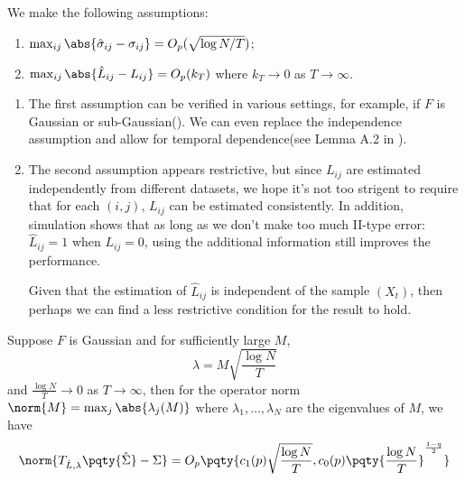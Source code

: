 \begin{asmp}\label{asmp:1}
    We make the following assumptions:
    \begin{enumerate}
        \item \(\max_{ij} \abs{\hat{\sigma}_{ij} - \sigma_{ij}} = O_{p}(\sqrt{\log N / T})\);
        \item \(\max_{ij} \abs{\hat{L}_{ij} - L_{ij}} = O_{p}(k_{T})\) where \(k_{T} \to 0\) as \(T \to \infty\).
    \end{enumerate}
\end{asmp}
\begin{remark}
    \begin{enumerate}
        \item 
        The first assumption can be verified in various settings, for example, if \(F\) is Gaussian or sub-Gaussian(\cite{cai2011AdaptiveThresholding}). We can even replace the independence assumption and allow for temporal dependence(see Lemma A.2 in \cite{shu2019EstimationLarge}). 
        \item The second assumption appears restrictive, but since \(L_{ij}\) are estimated independently from different datasets, we hope it's not too strigent to require that for each \((i,j)\), \(L_{ij}\) can be estimated consistently. In addition, simulation shows that as long as we don't make too much II-type error: \(\hat{L}_{ij} = 1\) when \(L_{ij} = 0\), using the additional information still improves the performance. 
        
        Given that the estimation of \(\hat{L}_{ij}\) is independent of the sample \((X_{t})\), then perhaps we can find a less restrictive condition for the result to hold.
    \end{enumerate}
\end{remark}


\begin{thm}
    Suppose \(F\) is Gaussian and for sufficiently large \(M\), 
    \begin{equation*}
        \lambda = M \sqrt{\frac{\log N}{T}}
    \end{equation*}
    and \(\frac{\log N}{T} \to 0\) as \(T \to \infty\), 
    then for the operator norm \(\norm{M}= \max_{j} \abs{\lambda_{j}(M)}\) where \(\lambda_{1},\dots,\lambda_{N}\) are the eigenvalues of \(M\), we have 
    \begin{equation*}
        \norm{T_{\hat{L},\lambda}\pqty{\hat{\Sigma}} - \Sigma } = O_{p}\pqty{c_{1}(p) \sqrt{\frac{\log N}{T}},  c_{0}(p)\pqty{\frac{\log N}{T}}^{\frac{1-q}{2}}}
    \end{equation*}
\end{thm}

